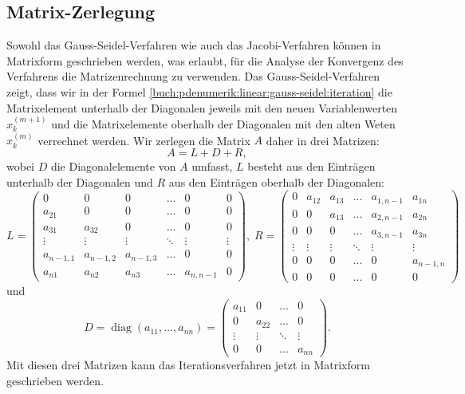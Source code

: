 \subsection{Matrix-Zerlegung
\label{buch:pdenumerik:linear:subsection:matrix-zerlegung}}
Sowohl das Gauss-Seidel-Verfahren wie auch das Jacobi-Verfahren können
in Matrixform geschrieben werden, was erlaubt, für die Analyse der Konvergenz
des Verfahrens die Matrizenrechnung zu verwenden.
Das Gauss-Seidel-Verfahren zeigt, dass wir in der Formel
\eqref{buch:pdenumerik:linear:gauss-seidel:iteration}
die Matrixelement unterhalb der Diagonalen jeweils mit den neuen
Variablenwerten $x_k^{(m+1)}$ und die Matrixelemente oberhalb der
Diagonalen mit den alten Weten $x_k^{(m)}$ verrechnet werden.
Wir zerlegen die Matrix $A$ daher in drei Matrizen:
\[
A = L + D + R,
\]
wobei $D$ die Diagonalelemente von $A$ umfasst, $L$ besteht aus den
Einträgen unterhalb der Diagonalen und $R$ aus den Einträgen oberhalb der
Diagonalen:
\[
L
=
\begin{pmatrix}
        0&        0&        0& \dots&        0&     0\\
   a_{21}&        0&        0& \dots&        0&     0\\
   a_{31}&   a_{32}&        0& \dots&        0&     0\\[-3pt]
   \vdots&   \vdots&   \vdots&\ddots&   \vdots&\vdots\\
a_{n-1,1}&a_{n-1,2}&a_{n-1,3}& \dots&        0&     0\\
   a_{n1}&   a_{n2}&   a_{n3}& \dots&a_{n,n-1}&     0
\end{pmatrix},
\;
R
=
\begin{pmatrix}
     0&a_{12}&a_{13}& \dots&a_{1,n-1}&   a_{1n}\\
     0&     0&a_{13}& \dots&a_{2,n-1}&   a_{2n}\\
     0&     0&     0& \dots&a_{3,n-1}&   a_{3n}\\[-3pt]
\vdots&\vdots&\vdots&\ddots&   \vdots&   \vdots\\
     0&     0&     0& \dots&        0&a_{n-1,n}\\
     0&     0&     0& \dots&        0&        0
\end{pmatrix}
\]
und
\[
D
=
\operatorname{diag}(a_{11},\dots,a_{nn})
=
\begin{pmatrix}
a_{11}&     0& \dots&     0\\
     0&a_{22}& \dots&     0\\[-3pt]
\vdots&\vdots&\ddots&\vdots\\
     0&     0& \dots& a_{nn}
\end{pmatrix}.
\]
Mit diesen drei Matrizen kann das Iterationsverfahren jetzt in
Matrixform geschrieben werden.

